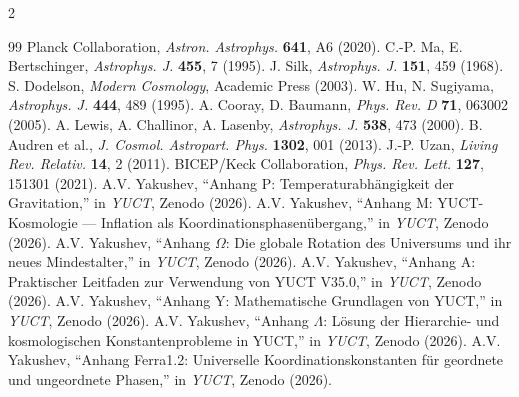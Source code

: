 \documentclass[11pt,a4paper]{article}
\begin{document}
\begin{multicols}{2}
		\begin{thebibliography}{99}
			 Planck Collaboration, \emph{Astron. Astrophys.} \textbf{641}, A6 (2020).
			 C.-P. Ma, E. Bertschinger, \emph{Astrophys. J.} \textbf{455}, 7 (1995).
			 J. Silk, \emph{Astrophys. J.} \textbf{151}, 459 (1968).
			 S. Dodelson, \emph{Modern Cosmology}, Academic Press (2003).
			 W. Hu, N. Sugiyama, \emph{Astrophys. J.} \textbf{444}, 489 (1995).
			 A. Cooray, D. Baumann, \emph{Phys. Rev. D} \textbf{71}, 063002 (2005).
			 A. Lewis, A. Challinor, A. Lasenby, \emph{Astrophys. J.} \textbf{538}, 473 (2000).
			 B. Audren et al., \emph{J. Cosmol. Astropart. Phys.} \textbf{1302}, 001 (2013).
			 J.-P. Uzan, \emph{Living Rev. Relativ.} \textbf{14}, 2 (2011).
			 BICEP/Keck Collaboration, \emph{Phys. Rev. Lett.} \textbf{127}, 151301 (2021).
			 A.V. Yakushev, ``Anhang P: Temperaturabhängigkeit der Gravitation,'' in \emph{YUCT}, Zenodo (2026).
			 A.V. Yakushev, ``Anhang M: YUCT-Kosmologie — Inflation als Koordinationsphasenübergang,'' in \emph{YUCT}, Zenodo (2026).
			 A.V. Yakushev, ``Anhang $\Omega$: Die globale Rotation des Universums und ihr neues Mindestalter,'' in \emph{YUCT}, Zenodo (2026).
			 A.V. Yakushev, ``Anhang A: Praktischer Leitfaden zur Verwendung von YUCT V35.0,'' in \emph{YUCT}, Zenodo (2026).
			 A.V. Yakushev, ``Anhang Y: Mathematische Grundlagen von YUCT,'' in \emph{YUCT}, Zenodo (2026).
			 A.V. Yakushev, ``Anhang $\Lambda$: Lösung der Hierarchie- und kosmologischen Konstantenprobleme in YUCT,'' in \emph{YUCT}, Zenodo (2026).
			 A.V. Yakushev, ``Anhang Ferra1.2: Universelle Koordinationskonstanten für geordnete und ungeordnete Phasen,'' in \emph{YUCT}, Zenodo (2026).
		\end{thebibliography}
		
	\end{multicols}
\end{document}
